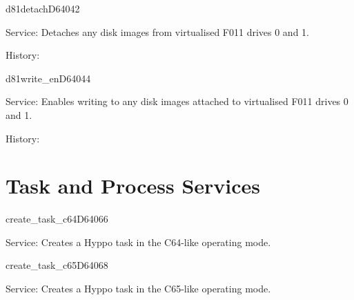 \newpage
\begin{hyppotrap}{d81detach}{D640}{42}
\item [Service:]
  Detaches any disk images from virtualised F011 drives 0 and 1.
\item [History:]
\end{hyppotrap}


%
\newpage
\begin{hyppotrap}{d81write\_en}{D640}{44}
\item [Service:]
  Enables writing to any disk images attached to virtualised F011 drives 0
  and 1.
\item [History:]
\end{hyppotrap}



\newpage
\section{Task and Process Services}


\begin{hyppotrap}{create\_task\_c64}{D640}{66}
\item [Service:]
  Creates a Hyppo task in the C64-like operating mode.
\notimplemented
\end{hyppotrap}


\begin{hyppotrap}{create\_task\_c65}{D640}{68}
\item [Service:]
  Creates a Hyppo task in the C65-like operating mode.
\notimplemented
\end{hyppotrap}


